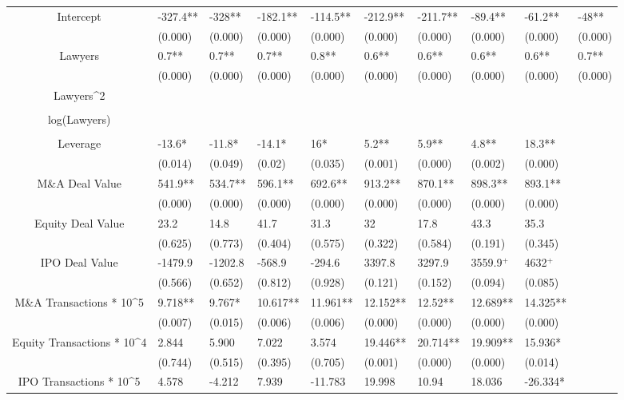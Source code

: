 \documentclass{article}
\begin{document}
\begin{table}[H]
\begin{tabular}{|clllllllll|}
Intercept & -327.4** & -328** & -182.1** & -114.5** & -212.9** & -211.7** & -89.4** & -61.2** & -48** \\
   & (0.000) & (0.000) & (0.000) & (0.000) & (0.000) & (0.000) & (0.000) & (0.000) & (0.000) \\
  Lawyers & 0.7** & 0.7** & 0.7** & 0.8** & 0.6** & 0.6** & 0.6** & 0.6** & 0.7** \\
   & (0.000) & (0.000) & (0.000) & (0.000) & (0.000) & (0.000) & (0.000) & (0.000) & (0.000) \\
  Lawyers^2 &  &  &  &  &  &  &  &  &  \\
   &  &  &  &  &  &  &  &  &  \\
  log(Lawyers) &  &  &  &  &  &  &  &  &  \\
   &  &  &  &  &  &  &  &  &  \\
  Leverage & -13.6* & -11.8* & -14.1* & 16* & 5.2** & 5.9** & 4.8** & 18.3** &  \\
   & (0.014) & (0.049) & (0.02) & (0.035) & (0.001) & (0.000) & (0.002) & (0.000) &  \\
  M\&A Deal Value & 541.9** & 534.7** & 596.1** & 692.6** & 913.2** & 870.1** & 898.3** & 893.1** &  \\
   & (0.000) & (0.000) & (0.000) & (0.000) & (0.000) & (0.000) & (0.000) & (0.000) &  \\
  Equity Deal Value & 23.2 & 14.8 & 41.7 & 31.3 & 32 & 17.8 & 43.3 & 35.3 &  \\
   & (0.625) & (0.773) & (0.404) & (0.575) & (0.322) & (0.584) & (0.191) & (0.345) &  \\
  IPO Deal Value & -1479.9 & -1202.8 & -568.9 & -294.6 & 3397.8 & 3297.9 & 3559.9$^{+}$ & 4632$^{+}$ &  \\
   & (0.566) & (0.652) & (0.812) & (0.928) & (0.121) & (0.152) & (0.094) & (0.085) &  \\
  M\&A Transactions * 10^5 & 9.718** & 9.767* & 10.617** & 11.961** & 12.152** & 12.52** & 12.689** & 14.325** &  \\
   & (0.007) & (0.015) & (0.006) & (0.006) & (0.000) & (0.000) & (0.000) & (0.000) &  \\
  Equity Transactions * 10^4 & 2.844 & 5.900 & 7.022 & 3.574 & 19.446** & 20.714** & 19.909** & 15.936* &  \\
   & (0.744) & (0.515) & (0.395) & (0.705) & (0.001) & (0.000) & (0.000) & (0.014) &  \\
  IPO Transactions * 10^5 & 4.578 & -4.212 & 7.939 & -11.783 & 19.998 & 10.94 & 18.036 & -26.334* &  \\

\end{tabular}
\end{table}
\end{document}

